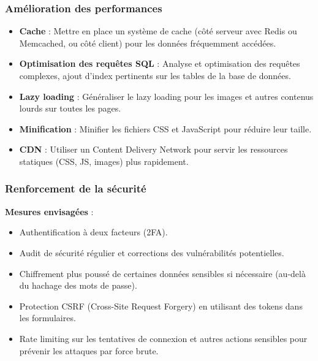 \documentclass[a4paper,12pt]{article}
\begin{document}
\subsubsection{Amélioration des performances}
\begin{itemize}
  \item \textbf{Cache} : Mettre en place un système de cache (côté serveur avec Redis ou Memcached, ou côté client) pour les données fréquemment accédées.
  \item \textbf{Optimisation des requêtes SQL} : Analyse et optimisation des requêtes complexes, ajout d'index pertinents sur les tables de la base de données.
  \item \textbf{Lazy loading} : Généraliser le lazy loading pour les images et autres contenus lourds sur toutes les pages.
  \item \textbf{Minification} : Minifier les fichiers CSS et JavaScript pour réduire leur taille.
  \item \textbf{CDN} : Utiliser un Content Delivery Network pour servir les ressources statiques (CSS, JS, images) plus rapidement.
\end{itemize}
\subsubsection{Renforcement de la sécurité}
\textbf{Mesures envisagées} :
\begin{itemize}
  \item Authentification à deux facteurs (2FA).
  \item Audit de sécurité régulier et corrections des vulnérabilités potentielles.
  \item Chiffrement plus poussé de certaines données sensibles si nécessaire (au-delà du hachage des mots de passe).
  \item Protection CSRF (Cross-Site Request Forgery) en utilisant des tokens dans les formulaires.
  \item Rate limiting sur les tentatives de connexion et autres actions sensibles pour prévenir les attaques par force brute.
\end{itemize}
\end{document}
